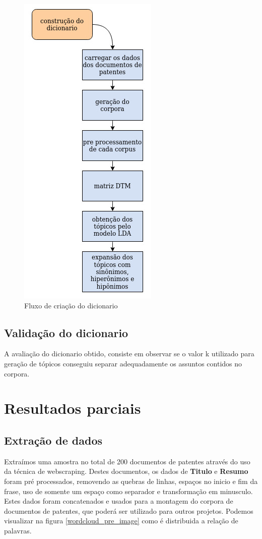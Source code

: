 \begin{figure}[ht!]
	\centering
	\includegraphics[scale=0.5]{imagens/tcc_dicionario.jpg}
	\caption{Fluxo de criação do dicionario
			 \label{dicionario_flow_image}}
\end{figure}

\subsection{Validação do dicionario}
A avaliação do dicionario obtido, consiste em observar se o valor k utilizado para geração de tópicos conseguiu separar adequadamente os assuntos contidos no corpora.

\section{Resultados parciais}

\subsection{Extração de dados}

Extraímos uma amostra no total de 200 documentos de patentes através do uso da técnica de webscraping. Destes documentos, os dados de \textbf{Titulo} e \textbf{Resumo} foram pré processados, removendo as quebras de linhas, espaços no inicio e fim da frase, uso de somente um espaço como separador e transformação em minusculo. Estes dados foram concatenados e usados para a montagem do corpora de documentos de patentes, que poderá ser utilizado para outros projetos. Podemos visualizar na figura \ref{wordcloud_pre_image} como é distribuida a relação de palavras.

